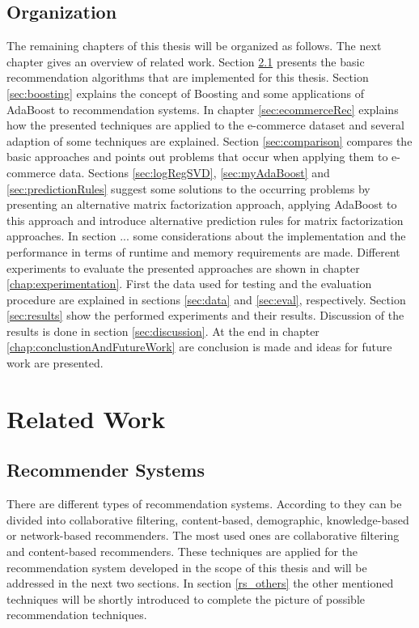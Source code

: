 \documentclass[10pt]{reportMaster}
\begin{document}
\section{Organization}
The remaining chapters of this thesis will be organized as follows.
The next chapter gives an overview of related work.
Section \ref{sec:recommenderSystems} presents the basic recommendation algorithms that are implemented for this thesis.
Section \ref{sec:boosting} explains the concept of Boosting and some applications of AdaBoost to recommendation systems.
In chapter \ref{sec:ecommerceRec} explains how the presented techniques are applied to the e-commerce dataset and several adaption of some techniques are explained.
Section \ref{sec:comparison} compares the basic approaches and points out problems that occur when applying them to e-commerce data.
Sections \ref{sec:logRegSVD}, \ref{sec:myAdaBoost} and \ref{sec:predictionRules} suggest some solutions to the occurring problems by presenting an alternative matrix factorization approach, applying AdaBoost to this approach and introduce alternative prediction rules for matrix factorization approaches. 
In section ... some considerations about the implementation and the performance in terms of runtime and memory requirements are made. %
Different experiments to evaluate the presented approaches are shown in chapter \ref{chap:experimentation}.
First the data used for testing and the evaluation procedure are explained in sections \ref{sec:data} and \ref{sec:eval}, respectively.
Section \ref{sec:results} show the performed experiments and their results.
Discussion of the results is done in section \ref{sec:discussion}.
At the end in chapter \ref{chap:conclustionAndFutureWork} are conclusion is made and ideas for future work are presented.






\chapter{Related Work}
\label{sec:relatedWork}

\section{Recommender Systems}
\label{sec:recommenderSystems}
There are different types of recommendation systems.
According to \cite{hybridSurvey} they can be divided into collaborative filtering, content-based, demographic, knowledge-based or network-based recommenders.
The most used ones are collaborative filtering and content-based recommenders.
These techniques are applied for the recommendation system developed in the scope of this thesis and will be addressed in the next two sections.
In section \ref{rs_others} the other mentioned techniques will be shortly introduced to complete the picture of possible recommendation techniques.
\end{document}
